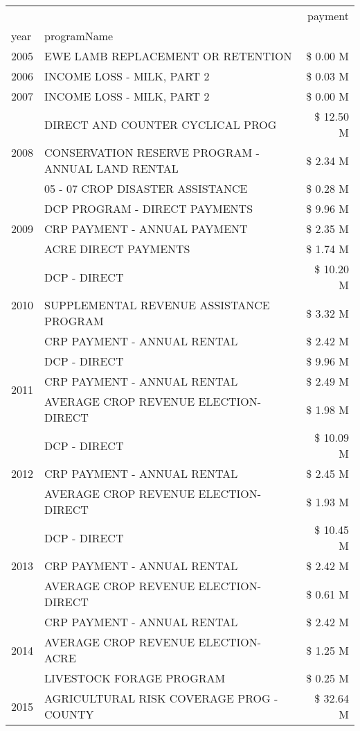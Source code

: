 \begin{tabular}{llr}
\toprule
 &  & payment \\
year & programName &  \\
\midrule
2005 & EWE LAMB REPLACEMENT OR RETENTION & \$ 0.00 M \\
\cline{1-3}
2006 & INCOME LOSS - MILK, PART 2 & \$ 0.03 M \\
\cline{1-3}
2007 & INCOME LOSS - MILK, PART 2 & \$ 0.00 M \\
\cline{1-3}
\multirow[t]{3}{*}{2008} & DIRECT AND COUNTER CYCLICAL PROG & \$ 12.50 M \\
 & CONSERVATION RESERVE PROGRAM - ANNUAL LAND RENTAL & \$ 2.34 M \\
 & 05 - 07 CROP DISASTER ASSISTANCE & \$ 0.28 M \\
\cline{1-3}
\multirow[t]{3}{*}{2009} & DCP PROGRAM - DIRECT PAYMENTS & \$ 9.96 M \\
 & CRP PAYMENT - ANNUAL PAYMENT & \$ 2.35 M \\
 & ACRE DIRECT PAYMENTS & \$ 1.74 M \\
\cline{1-3}
\multirow[t]{3}{*}{2010} & DCP - DIRECT & \$ 10.20 M \\
 & SUPPLEMENTAL REVENUE ASSISTANCE PROGRAM & \$ 3.32 M \\
 & CRP PAYMENT - ANNUAL RENTAL & \$ 2.42 M \\
\cline{1-3}
\multirow[t]{3}{*}{2011} & DCP - DIRECT & \$ 9.96 M \\
 & CRP PAYMENT - ANNUAL RENTAL & \$ 2.49 M \\
 & AVERAGE CROP REVENUE ELECTION-DIRECT & \$ 1.98 M \\
\cline{1-3}
\multirow[t]{3}{*}{2012} & DCP - DIRECT & \$ 10.09 M \\
 & CRP PAYMENT - ANNUAL RENTAL & \$ 2.45 M \\
 & AVERAGE CROP REVENUE ELECTION-DIRECT & \$ 1.93 M \\
\cline{1-3}
\multirow[t]{3}{*}{2013} & DCP - DIRECT & \$ 10.45 M \\
 & CRP PAYMENT - ANNUAL RENTAL & \$ 2.42 M \\
 & AVERAGE CROP REVENUE ELECTION-DIRECT & \$ 0.61 M \\
\cline{1-3}
\multirow[t]{3}{*}{2014} & CRP PAYMENT - ANNUAL RENTAL & \$ 2.42 M \\
 & AVERAGE CROP REVENUE ELECTION-ACRE & \$ 1.25 M \\
 & LIVESTOCK FORAGE PROGRAM & \$ 0.25 M \\
\cline{1-3}
\multirow[t]{3}{*}{2015} & AGRICULTURAL RISK COVERAGE PROG - COUNTY & \$ 32.64 M \\

\end{tabular}
